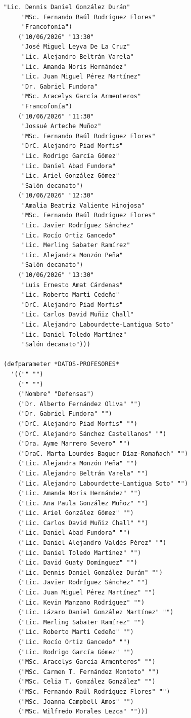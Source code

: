 \documentclass[12pt,a4paper]{report}
\begin{document}
\begin{lstlisting}[caption={data-tutorial.lisp --- datos de entrada.}]
     "Lic. Dennis Daniel González Durán"
     "MSc. Fernando Raúl Rodríguez Flores"
     "Francofonía")
    ("10/06/2026" "13:30"
     "José Miguel Leyva De La Cruz"
     "Lic. Alejandro Beltrán Varela"
     "Lic. Amanda Noris Hernández"
     "Lic. Juan Miguel Pérez Martínez"
     "Dr. Gabriel Fundora"
     "MSc. Aracelys García Armenteros"
     "Francofonía")
    ("10/06/2026" "11:30"
     "Jossué Arteche Muñoz"
     "MSc. Fernando Raúl Rodríguez Flores"
     "DrC. Alejandro Piad Morfis"
     "Lic. Rodrigo García Gómez"
     "Lic. Daniel Abad Fundora"
     "Lic. Ariel González Gómez"
     "Salón decanato")
    ("10/06/2026" "12:30"
     "Amalia Beatriz Valiente Hinojosa"
     "MSc. Fernando Raúl Rodríguez Flores"
     "Lic. Javier Rodríguez Sánchez"
     "Lic. Rocío Ortiz Gancedo"
     "Lic. Merling Sabater Ramírez"
     "Lic. Alejandra Monzón Peña"
     "Salón decanato")
    ("10/06/2026" "13:30"
     "Luis Ernesto Amat Cárdenas"
     "Lic. Roberto Marti Cedeño"
     "DrC. Alejandro Piad Morfis"
     "Lic. Carlos David Muñiz Chall"
     "Lic. Alejandro Labourdette-Lantigua Soto"
     "Lic. Daniel Toledo Martínez"
     "Salón decanato")))

(defparameter *DATOS-PROFESORES*
  '(("" "")
    ("" "")
    ("Nombre" "Defensas")
    ("Dr. Alberto Fernández Oliva" "")
    ("Dr. Gabriel Fundora" "")
    ("DrC. Alejandro Piad Morfis" "")
    ("DrC. Alejandro Sánchez Castellanos" "")
    ("Dra. Ayme Marrero Severo" "")
    ("DraC. Marta Lourdes Baguer Díaz-Romañach" "")
    ("Lic. Alejandra Monzón Peña" "")
    ("Lic. Alejandro Beltrán Varela" "")
    ("Lic. Alejandro Labourdette-Lantigua Soto" "")
    ("Lic. Amanda Noris Hernández" "")
    ("Lic. Ana Paula González Muñoz" "")
    ("Lic. Ariel González Gómez" "")
    ("Lic. Carlos David Muñiz Chall" "")
    ("Lic. Daniel Abad Fundora" "")
    ("Lic. Daniel Alejandro Valdés Pérez" "")
    ("Lic. Daniel Toledo Martínez" "")
    ("Lic. David Guaty Domínguez" "")
    ("Lic. Dennis Daniel González Durán" "")
    ("Lic. Javier Rodríguez Sánchez" "")
    ("Lic. Juan Miguel Pérez Martínez" "")
    ("Lic. Kevin Manzano Rodríguez" "")
    ("Lic. Lázaro Daniel González Martínez" "")
    ("Lic. Merling Sabater Ramírez" "")
    ("Lic. Roberto Marti Cedeño" "")
    ("Lic. Rocío Ortiz Gancedo" "")
    ("Lic. Rodrigo García Gómez" "")
    ("MSc. Aracelys García Armenteros" "")
    ("MSc. Carmen T. Fernández Montoto" "")
    ("MSc. Celia T. González González" "")
    ("MSc. Fernando Raúl Rodríguez Flores" "")
    ("MSc. Joanna Campbell Amos" "")
    ("MSc. Wilfredo Morales Lezca" "")))
\end{lstlisting}
\end{document}
